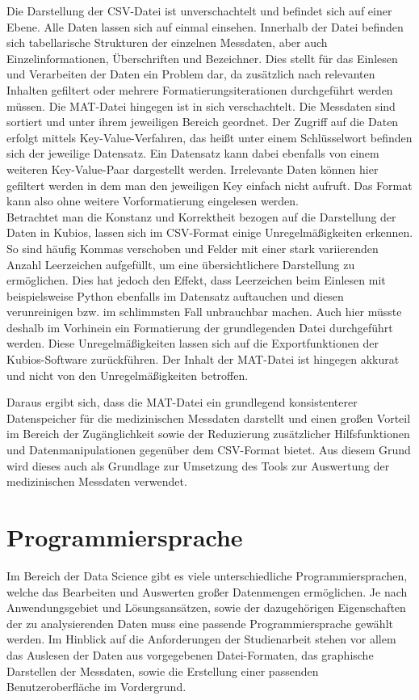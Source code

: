 Die Darstellung der CSV-Datei ist unverschachtelt und befindet sich auf einer Ebene. Alle Daten lassen sich auf einmal einsehen. Innerhalb der Datei befinden sich tabellarische Strukturen der einzelnen Messdaten, aber auch Einzelinformationen, Überschriften und Bezeichner. Dies stellt für das Einlesen und Verarbeiten der Daten ein Problem dar, da zusätzlich nach relevanten Inhalten gefiltert oder mehrere Formatierungsiterationen durchgeführt werden müssen. Die MAT-Datei hingegen ist in sich verschachtelt. Die Messdaten sind sortiert und unter ihrem jeweiligen Bereich geordnet. Der Zugriff auf die Daten erfolgt mittels Key-Value-Verfahren, das heißt unter einem Schlüsselwort befinden sich der jeweilige Datensatz. Ein Datensatz kann dabei ebenfalls von einem weiteren Key-Value-Paar dargestellt werden. Irrelevante Daten können hier gefiltert werden in dem man den jeweiligen Key einfach nicht aufruft. Das Format kann also ohne weitere Vorformatierung eingelesen werden.\\
Betrachtet man die Konstanz und Korrektheit bezogen auf die Darstellung der Daten in Kubios, lassen sich im CSV-Format einige Unregelmäßigkeiten erkennen. So sind häufig Kommas verschoben und Felder mit einer stark variierenden Anzahl Leerzeichen aufgefüllt, um eine übersichtlichere Darstellung zu ermöglichen. Dies hat jedoch den Effekt, dass Leerzeichen beim Einlesen mit beispielsweise Python ebenfalls im Datensatz auftauchen und diesen verunreinigen bzw. im schlimmsten Fall unbrauchbar machen. Auch hier müsste deshalb im Vorhinein ein Formatierung der grundlegenden Datei durchgeführt werden. Diese Unregelmäßigkeiten lassen sich auf die Exportfunktionen der Kubios-Software zurückführen. Der Inhalt der MAT-Datei ist hingegen akkurat und nicht von den Unregelmäßigkeiten betroffen.

Daraus ergibt sich, dass die MAT-Datei ein grundlegend konsistenterer Datenspeicher für die medizinischen Messdaten darstellt und einen großen Vorteil im Bereich der Zugänglichkeit sowie der Reduzierung zusätzlicher Hilfsfunktionen und Datenmanipulationen gegenüber dem CSV-Format bietet. Aus diesem Grund wird dieses auch als Grundlage zur Umsetzung des Tools zur Auswertung der medizinischen Messdaten verwendet.


\section{Programmiersprache}

Im Bereich der Data Science gibt es viele unterschiedliche Programmiersprachen, welche das Bearbeiten und Auswerten großer Datenmengen ermöglichen. Je nach Anwendungsgebiet und Lösungsansätzen, sowie der dazugehörigen Eigenschaften der zu analysierenden Daten muss eine passende Programmiersprache gewählt werden. Im Hinblick auf die Anforderungen der Studienarbeit stehen vor allem das Auslesen der Daten aus vorgegebenen Datei-Formaten, das graphische Darstellen der Messdaten, sowie die Erstellung einer passenden Benutzeroberfläche im Vordergrund.\cite{dataSciLang}

